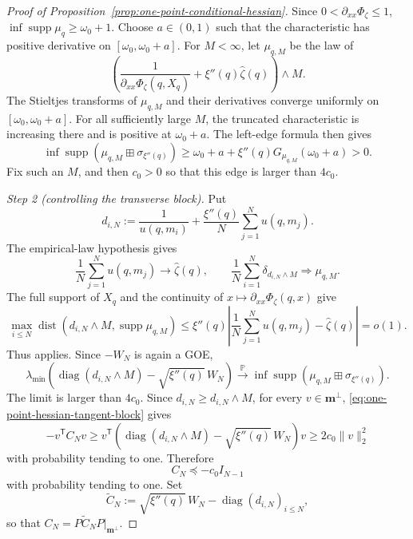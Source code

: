 \documentclass[a4paper,10pt,reqno]{amsart}
\numberwithin{equation}{section}
\newcommand{\dP}{\mathbb{P}}%
\newcommand{\bfm}{\mathbf{m}}
\begin{document}
\begin{proof}[Proof of Proposition~\ref{prop:one-point-conditional-hessian}]
		Since \(0<\partial_{xx}\Phi_\zeta\le1\),
		\(\inf\operatorname{supp}\mu_q\ge\omega_0+1\). Choose
		\(a\in(0,1)\) such that the characteristic has positive derivative on
		\([\omega_0,\omega_0+a]\). For \(M<\infty\), let
		\(\mu_{q,M}\) be the law of
		\[
		\left(
		\frac1{\partial_{xx}\Phi_\zeta(q,X_q)}
		+\xi''(q)\widehat\zeta(q)
		\right)\wedge M.
		\]
		The Stieltjes transforms of \(\mu_{q,M}\) and their derivatives
		converge uniformly on \([\omega_0,\omega_0+a]\). For all sufficiently
		large \(M\), the truncated characteristic is increasing there and is
		positive at \(\omega_0+a\). The left-edge formula then gives
		\[
		\inf\operatorname{supp}
		\left(\mu_{q,M}\boxplus\sigma_{\xi''(q)}\right)
		\ge
		\omega_0+a+\xi''(q)G_{\mu_{q,M}}(\omega_0+a)>0.
		\]
		Fix such an \(M\), and then \(c_0>0\) so that this edge is larger than
		\(4c_0\).
		
		\medskip\noindent\emph{Step 2 (controlling the transverse block).}
		Put
		\[
		d_{i,N}
		:=
		\frac1{u(q,m_i)}
		+\frac{\xi''(q)}N\sum_{j=1}^Nu(q,m_j).
		\]
		The empirical-law hypothesis gives
		\[
		\frac1N\sum_{j=1}^Nu(q,m_j)
		\longrightarrow\widehat\zeta(q),
		\qquad
		\frac1N\sum_{i=1}^N\delta_{d_{i,N}\wedge M}
		\Longrightarrow\mu_{q,M}.
		\]
		The full support of \(X_q\) and the continuity of
		\(x\mapsto\partial_{xx}\Phi_\zeta(q,x)\) give
		\[
		\max_{i\le N}
		\operatorname{dist}\left(
		d_{i,N}\wedge M,\operatorname{supp}\mu_{q,M}
		\right)
		\le
		\xi''(q)\left|
		\frac1N\sum_{j=1}^Nu(q,m_j)-\widehat\zeta(q)
		\right|
		=o(1).
		\]
		Thus \cite[Proposition~8.1]{CapitaineDonatiMartinFeralFevrier2011}
		applies. Since \(-W_N\) is again a GOE,
		\[
		\lambda_{\min}\left(
		\operatorname{diag}(d_{i,N}\wedge M)
		-\sqrt{\xi''(q)}\,W_N
		\right)
		\xrightarrow{\dP}
		\inf\operatorname{supp}
		\left(\mu_{q,M}\boxplus\sigma_{\xi''(q)}\right).
		\]
		The limit is larger than \(4c_0\). Since
		\(d_{i,N}\ge d_{i,N}\wedge M\), for every
		\(v\in\bfm^\perp\), \eqref{eq:one-point-hessian-tangent-block} gives
		\[
		-v^{\mathsf T}C_Nv
		\ge
		v^{\mathsf T}
		\left(
		\operatorname{diag}(d_{i,N}\wedge M)
		-\sqrt{\xi''(q)}\,W_N
		\right)v
		\ge2c_0\|v\|_2^2
		\]
		with probability tending to one. Therefore
		\begin{equation}\label{eq:one-point-hessian-bulk-gap}
			C_N\preceq-c_0I_{N-1}
		\end{equation}
		with probability tending to one.
		Set
		\[
		\widetilde C_N
		:=
		\sqrt{\xi''(q)}\,W_N
		-\operatorname{diag}(d_{i,N})_{i\le N},
		\]
		so that \(C_N=P\widetilde C_NP|_{\bfm^\perp}\).
		

\end{proof}
\end{document}
